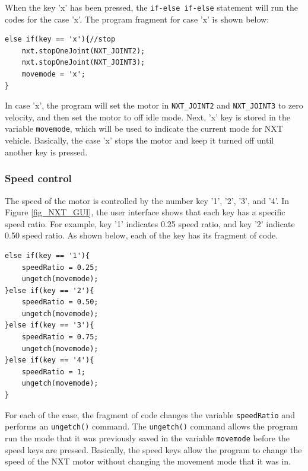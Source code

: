 \documentclass[11pt]{article}
\begin{document}
\newline
When the key 'x' has been pressed, the \verb+if-else if-else+ statement will run the codes for the case 'x'.
The program fragment for case 'x' is shown below:
\begin{lstlisting}
else if(key == 'x'){//stop
    nxt.stopOneJoint(NXT_JOINT2);
    nxt.stopOneJoint(NXT_JOINT3);
    movemode = 'x';
}
\end{lstlisting}
In case 'x', the program will set the motor in \verb+NXT_JOINT2+ and \verb+NXT_JOINT3+ to zero 
velocity, and then set the motor to off idle mode. Next, 'x' key is stored in the variable 
\verb+movemode+, which will be used to indicate the current mode for NXT vehicle.
Basically, the case 'x' stops the motor and keep it turned off until another key is pressed.

\subsubsection*{Speed control}
The speed of the motor is controlled by the number key '1', '2', '3', and '4'.
In Figure \ref{fig_NXT_GUI}, the user interface shows that each key has a specific speed ratio.
For example, key '1' indicates 0.25 speed ratio, and key '2' indicate 0.50 speed ratio.
As shown below, each of the key has its fragment of code.
\begin{lstlisting}
else if(key == '1'){
    speedRatio = 0.25;
    ungetch(movemode);
}else if(key == '2'){
    speedRatio = 0.50;
    ungetch(movemode);
}else if(key == '3'){
    speedRatio = 0.75;
    ungetch(movemode);
}else if(key == '4'){
    speedRatio = 1;
    ungetch(movemode);
}
\end{lstlisting}
For each of the case, the fragment of code changes the variable \verb+speedRatio+ and performs an \verb+ungetch()+ command.
The \verb+ungetch()+ command allows the program run the mode that it was previously saved in the variable \verb+movemode+
before the speed keys are pressed. Basically, the speed keys allow the program to change the speed of the NXT motor without 
changing the movement mode that it was in.
\end{document}
